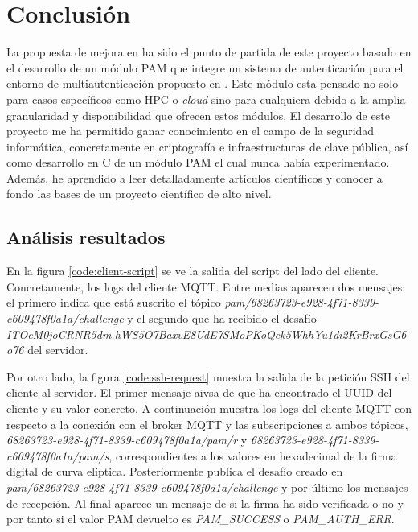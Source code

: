 \chapter{Conclusión}
\label{chap:conclusion}

La propuesta de mejora en \cite{tesisIliaBlockin} ha sido el punto de partida de este proyecto basado en el desarrollo de un 
módulo PAM que integre un sistema de autenticación para el entorno de multiautenticación propuesto en \cite{multipauthpaper}. 
Este módulo esta pensado no solo para casos específicos como HPC o \textit{cloud} sino para cualquiera debido a la amplia 
granularidad y disponibilidad que ofrecen estos módulos. 
El desarrollo de este proyecto me ha permitido ganar conocimiento en el campo de la seguridad informática, concretamente en 
criptografía e infraestructuras de clave pública, así como desarrollo en C de un módulo PAM el cual nunca había experimentado.
Además, he aprendido a leer detalladamente artículos científicos y conocer a fondo las bases de un proyecto científico de alto 
nivel.

\section{Análisis resultados}

En la figura \ref{code:client-script} se ve la salida del script del lado del cliente. Concretamente, los logs del cliente MQTT. 
Entre medias aparecen dos mensajes: el primero indica que está suscrito el tópico \textit{pam/68263723-e928-4f71-8339-c609478f0a1a/challenge}
y el segundo que ha recibido el desafío \textit{ITOeM0joCRNR5dm.hWS5O7BaxvE8UdE7SMoPKoQck5WhhYu1di2KrBrxGsG6o76} del servidor.

Por otro lado, la figura \ref{code:ssh-request} muestra la salida de la petición SSH del cliente al servidor. El primer mensaje
aivsa de que ha encontrado el UUID del cliente y su valor concreto. A continuación muestra los logs del cliente MQTT con respecto 
a la conexión con el broker MQTT y las subscripciones a ambos tópicos, \textit{68263723-e928-4f71-8339-c609478f0a1a/pam/r} y 
\textit{68263723-e928-4f71-8339-c609478f0a1a/pam/s}, correspondientes a los valores en hexadecimal de la firma digital de 
curva elíptica. Posteriormente publica el desafío creado en \textit{pam/68263723-e928-4f71-8339-c609478f0a1a/challenge} y 
por último los mensajes de recepción. Al final aparece un mensaje de si la firma ha sido verificada o no y por tanto si el 
valor PAM devuelto es \textit{PAM\_SUCCESS} o \textit{PAM\_AUTH\_ERR}.  

